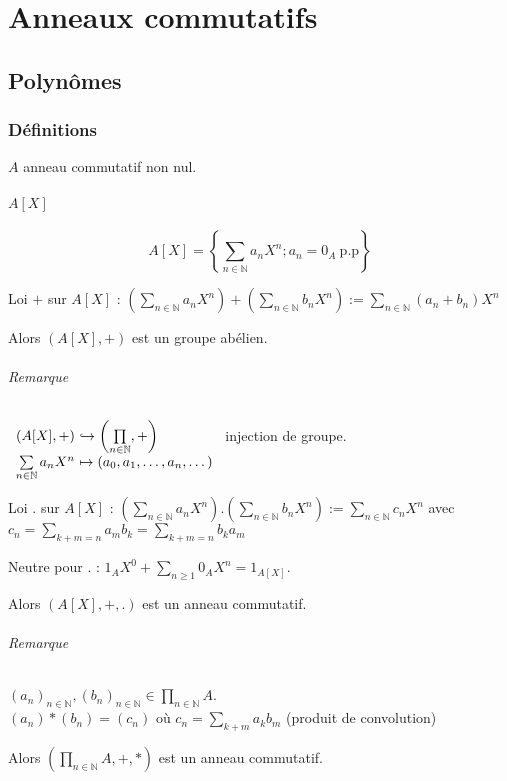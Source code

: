 \documentclass[reqno,a4paper,10pt]{report}
\newcommand{\set}[1]{\left\lbrace #1 \right\rbrace} %
\newcommand{\IN}{\ensuremath{\mathbb{N}}\xspace} %
\newcommand{\inj}{\hookrightarrow}
\begin{document}
\pagebreak
\part{Anneaux commutatifs}
\chapter{Polynômes}
\section{Définitions}
$A$ anneau commutatif non nul.
\subsection{$A[X]$}
\[A[X] = \set{\sum_{n \in \IN} a_n X^n; a_n = 0_A \ \text{p.p}}\]

Loi $+$ sur $A[X]$ : $\displaystyle \left( \sum_{n \in \IN} a_n X^n \right) +
\left( \sum_{n \in \IN} b_n X^n \right) := \sum_{n \in \IN} (a_n + b_n) X^n$

Alors $(A[X], +)$ est un groupe abélien.
\paragraph{Remarque}
$\begin{array}[t]{r@{\ }l}
  (A[X], + ) &\inj \left(\prod\limits_{n \in \IN}, +\right)\\
  \sum\limits_{n\in \IN} a_n X^n &\mapsto (a_0, a_1, \dots, a_n, \dots)
\end{array}$ injection de groupe.

Loi $.$ sur $A[X]$ : $\displaystyle \left( \sum_{n \in \IN} a_n X^n \right) .
\left( \sum_{n\in \IN} b_n X^n \right) := \sum_{n \in \IN} c_n X^n$ avec
$\displaystyle c_n = \sum_{k+m = n} a_m b_k =\sum_{k+m = n} b_k a_m$

Neutre pour $.$ : $\displaystyle 1_A X^0 + \sum_{n \geq 1} 0_A X^n =
1_{A[X]}$.

Alors $\left( A[X], +, . \right)$ est un anneau commutatif.

\paragraph{Remarque} $ (a_n)_{n \in \IN}, (b_n)_{n \in \IN} \in
\prod_{n \in \IN} A$.\\
$(a_n) * (b_n) = (c_n)$ où $\displaystyle c_n = \sum_{k+m} a_k b_m$ (produit
de convolution)

Alors $\displaystyle\left( \prod_{n\in \IN} A , +, * \right)$ est un anneau
commutatif.
\end{document}
